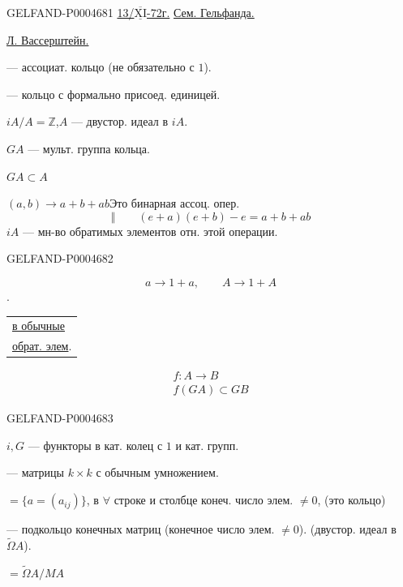 \begin{GelfandAdjacentEvidence}{GELFAND-P000468}{1}
\underline{13/\mbox{$\overline{\underline{\mathrm{XI}}}$}-72г.}
\quad\underline{Сем. Гельфанда.}

\underline{Л. Вассерштейн.}

 — ассоциат. кольцо (не обязательно с $1$).

 — кольцо с формально присоед. единицей.

$iA/A=\mathbb Z$,\quad $A$ — двустор. идеал в $iA$.

$GA$ — мульт. группа кольца.

$GA\subset A$

$(a,b)\longrightarrow a+b+ab$\qquad Это бинарная ассоц. опер.
\[
\Vert\qquad (e+a)(e+b)-e=a+b+ab
\]
\sout{\mbox{$iA$}}\quad {} — мн-во обратимых элементов отн. этой операции.
\end{GelfandAdjacentEvidence}
\begin{GelfandAdjacentEvidence}{GELFAND-P000468}{2}


\[
a\longrightarrow1+a,\qquad A\longrightarrow1+A
\]
.\quad
\begin{tabular}[t]{@{}l@{}}
\underline{в обычные}\\
\underline{обрат. элем}.
\end{tabular}

\[
\begin{gathered}
f:A\longrightarrow B\\
f(GA)\subset GB
\end{gathered}
\]
\end{GelfandAdjacentEvidence}
\begin{GelfandAdjacentEvidence}{GELFAND-P000468}{3}


$i,G$ — функторы в кат. колец с $1$ и кат. групп.

 — матрицы $k\times k$ с обычным умножением.

$=\{a=(a_{ij})\}$,
в $\forall$ строке и столбце конеч. число элем. $\ne0$,
(это кольцо)

 — подкольцо конечных матриц (конечное число элем. $\ne0$).
(двустор. идеал в $\widetilde\Omega A$).

$=\widetilde\Omega A/MA$
\end{GelfandAdjacentEvidence}
